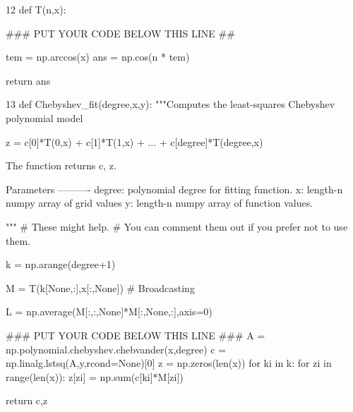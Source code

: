 12
def T(n,x):
    
    ### PUT YOUR CODE BELOW THIS LINE ##

    tem = np.arccos(x)
    ans = np.cos(n * tem)
    
    return ans
    
    


13
def Chebyshev_fit(degree,x,y):
    """Computes the least-squares Chebyshev polynomial model 
    
        z = c[0]*T(0,x) + c[1]*T(1,x) + ... + c[degree]*T(degree,x)
        
        The function returns c, z. 
    
    Parameters
    ----------
    degree: polynomial degree for fitting function.
    x: length-n numpy array of grid values
    y: length-n numpy array of function values.
    
    
    """
    # These might help. 
    # You can comment them out if you prefer not to use them.
    
    k = np.arange(degree+1)
    
    M = T(k[None,:],x[:,None]) # Broadcasting
    
    L = np.average(M[:,:,None]*M[:,None,:],axis=0)

    ### PUT YOUR CODE BELOW THIS LINE ###
    A = np.polynomial.chebyshev.chebvander(x,degree)
    c = np.linalg.lstsq(A,y,rcond=None)[0]
    z = np.zeros(len(x))
    for ki in k:
        for zi in range(len(x)):
            z[zi] = np.sum(c[ki]*M[zi])

    return c,z